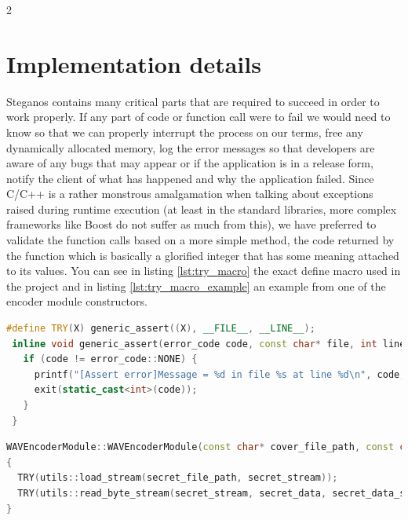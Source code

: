 \begin{multicols}{2}
\section{Implementation details}
Steganos contains many critical parts that are required to succeed in order to work properly. If any part of code or function call were to fail we would need to know so that we can properly interrupt the process on our terms, free any dynamically allocated memory, log the error messages so that developers are aware of any bugs that may appear or if the application is in a release form, notify the client of what has happened and why the application failed. Since C/C++ is a rather monstrous amalgamation when talking about exceptions raised during runtime execution (at least in the standard libraries, more complex frameworks like Boost do not suffer as much from this), we have preferred to validate the function calls based on a more simple method, the code returned by the function which is basically a glorified integer that has some meaning attached to its values. You can see in listing \ref{lst:try_macro} the exact define macro used in the project and in listing \ref{lst:try_macro_example} an example from one of the encoder module constructors.

\end{multicols}
\begin{lstlisting}[language=C++, caption=The TRY macro used for any critical operation,label={lst:try_macro}]
 #define TRY(X) generic_assert((X), __FILE__, __LINE__);
 inline void generic_assert(error_code code, const char* file, int line) {
   if (code != error_code::NONE) {
     printf("[Assert error]Message = %d in file %s at line %d\n", code, file, line);
     exit(static_cast<int>(code));
   }
 }
\end{lstlisting}

\begin{lstlisting}[language=C++, caption=Usage example of the TRY macro,label={lst:try_macro_example}]
WAVEncoderModule::WAVEncoderModule(const char* cover_file_path, const char* secret_file_path) : WAVModule(cover_file_path) 
{
  TRY(utils::load_stream(secret_file_path, secret_stream));
  TRY(utils::read_byte_stream(secret_stream, secret_data, secret_data_size));
}
\end{lstlisting}

